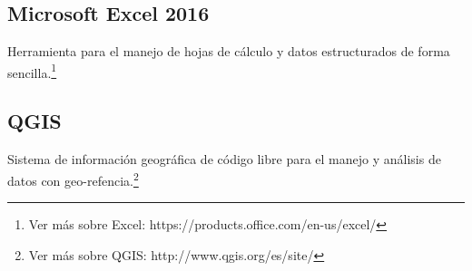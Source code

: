 \subsection{Microsoft Excel 2016}
Herramienta para el manejo de hojas de cálculo y datos estructurados de forma sencilla.\footnote{Ver más sobre Excel: https://products.office.com/en-us/excel/}
\subsection{QGIS}
Sistema de información geográfica de código libre para el manejo y análisis de datos con geo-refencia.\footnote{Ver más sobre QGIS: http://www.qgis.org/es/site/}